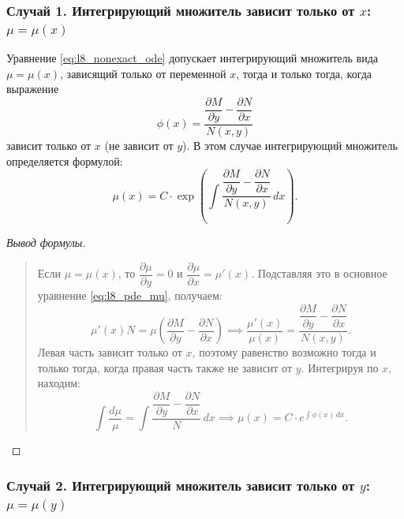 \subsubsection{Случай 1. Интегрирующий множитель зависит только от $x$: $\mu = \mu(x)$}

\begin{proposition}
    Уравнение \eqref{eq:l8_nonexact_ode} допускает интегрирующий множитель
    вида $\mu = \mu(x)$, зависящий только от переменной $x$, тогда и только
    тогда, когда выражение
    \begin{equation} \label{eq:l8_cond_mux}
        \phi(x) = \frac{\dfrac{\partial M}{\partial y} -
        \dfrac{\partial N}{\partial x}}{N(x, y)} \tag{9}
    \end{equation}
    зависит только от $x$ (не зависит от $y$). В этом случае интегрирующий
    множитель определяется формулой:
    \begin{equation} \label{eq:l8_form_mux}
        \mu(x) = C \cdot \exp\left(\int \frac{\dfrac{\partial M}{\partial y} -
        \dfrac{\partial N}{\partial x}}{N(x, y)} \, dx\right). \tag{10}
    \end{equation}
\end{proposition}

\begin{proof}[Вывод формулы]~\\
    \begin{quote}
        Если $\mu = \mu(x)$, то $\dfrac{\partial \mu}{\partial y} = 0$ и
        $\dfrac{\partial \mu}{\partial x} = \mu'(x)$. Подставляя это в основное
        уравнение \eqref{eq:l8_pde_mu}, получаем:
        \[
            \mu'(x) N = \mu \left(\frac{\partial M}{\partial y} -
            \frac{\partial N}{\partial x}\right) \implies
            \frac{\mu'(x)}{\mu(x)} =
            \frac{\dfrac{\partial M}{\partial y} -
            \dfrac{\partial N}{\partial x}}{N(x, y)}.
        \]
        Левая часть зависит только от $x$, поэтому равенство возможно тогда и
        только тогда, когда правая часть также не зависит от $y$. Интегрируя
        по $x$, находим:
        \[
            \int \frac{d\mu}{\mu} =
            \int \frac{\dfrac{\partial M}{\partial y} -
            \dfrac{\partial N}{\partial x}}{N} \, dx \implies
            \mu(x) = C \cdot e^{\int \phi(x) \, dx}.
        \]
    \end{quote}
\end{proof}

\subsubsection{Случай 2. Интегрирующий множитель зависит только от $y$: $\mu = \mu(y)$}

